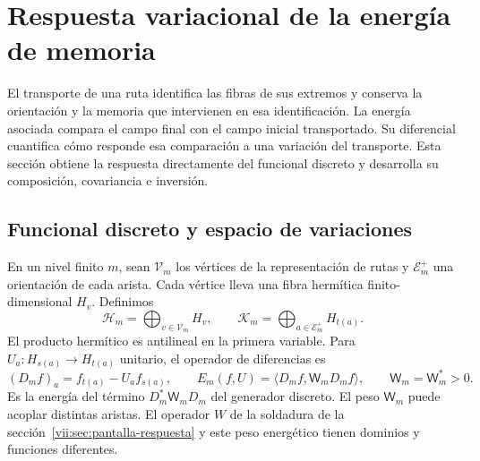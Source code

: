 
\section{Respuesta variacional de la energía de memoria}
\label{vii:sec:variacion-memoria}

El transporte de una ruta identifica las fibras de sus extremos y conserva
la orientación y la memoria que intervienen en esa identificación. La energía
asociada compara el campo final con el campo inicial transportado. Su
diferencial cuantifica cómo responde esa comparación a una variación del
transporte. Esta sección obtiene la respuesta directamente del funcional
discreto y desarrolla su composición, covariancia e inversión.

\subsection{Funcional discreto y espacio de variaciones}
\label{vii:subsec:funcional-memoria}

En un nivel finito \(m\), sean \(\mathcal V_m\) los vértices de la
representación de rutas y \(\mathcal E_m^+\) una orientación de cada arista.
Cada vértice lleva una fibra hermítica finito-dimensional \(H_v\).
Definimos
\[
 \mathcal H_m=\bigoplus_{v\in\mathcal V_m}H_v,\qquad
 \mathcal K_m=\bigoplus_{a\in\mathcal E_m^+}H_{t(a)}.
\]
El producto hermítico es antilineal en la primera variable.
Para \(U_a:H_{s(a)}\to H_{t(a)}\) unitario, el operador de diferencias es
\begin{equation}
 (D_mf)_a=f_{t(a)}-U_af_{s(a)},\qquad
 E_m(f,U)=\langle D_mf,\mathsf W_mD_mf\rangle,\qquad
 \mathsf W_m=\mathsf W_m^*>0.
 \label{vii:eq:energia-memoria-discreta}
\end{equation}
Es la energía del término \(D_m^*\mathsf W_mD_m\) del generador discreto.
El peso \(\mathsf W_m\) puede acoplar distintas aristas. El operador \(W\)
de la soldadura de la sección~\ref{vii:sec:pantalla-respuesta} y este peso
energético tienen dominios y funciones diferentes.

